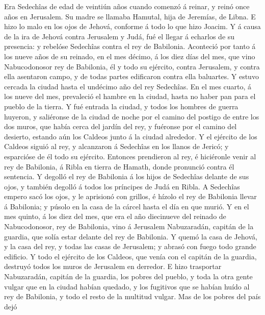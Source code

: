  Era Sedechîas de edad de veintiún años cuando comenzó á
reinar, y reinó once años en Jerusalem. Su madre se llamaba Hamutal,
hija de Jeremías, de Libna.  E hizo lo malo en los ojos de
Jehová, conforme á todo lo que hizo Joacim.  Y á causa de
la ira de Jehová contra Jerusalem y Judá, fué el llegar á echarlos de su
presencia: y rebelóse Sedechîas contra el rey de Babilonia.
 Aconteció por tanto á los nueve años de su reinado, en el
mes décimo, á los diez días del mes, que vino Nabucodonosor rey de
Babilonia, él y todo su ejército, contra Jerusalem, y contra ella
asentaron campo, y de todas partes edificaron contra ella baluartes.
 Y estuvo cercada la ciudad hasta el undécimo año del rey
Sedechîas.  En el mes cuarto, á los nueve del mes,
prevaleció el hambre en la ciudad, hasta no haber pan para el pueblo de
la tierra.  Y fué entrada la ciudad, y todos los hombres
de guerra huyeron, y saliéronse de la ciudad de noche por el camino del
postigo de entre los dos muros, que había cerca del jardín del rey, y
fuéronse por el camino del desierto, estando aún los Caldeos junto á la
ciudad alrededor.  Y el ejército de los Caldeos siguió al
rey, y alcanzaron á Sedechîas en los llanos de Jericó; y esparcióse de
él todo su ejército.  Entonces prendieron al rey, é
hiciéronle venir al rey de Babilonia, á Ribla en tierra de Hamath, donde
pronunció contra él sentencia.  Y degolló el rey de
Babilonia á los hijos de Sedechîas delante de sus ojos, y también
degolló á todos los príncipes de Judá en Ribla.  A
Sedechîas empero sacó los ojos, y le aprisionó con grillos, é hízolo el
rey de Babilonia llevar á Babilonia; y púsolo en la casa de la cárcel
hasta el día en que murió.  Y en el mes quinto, á los
diez del mes, que era el año diecinueve del reinado de Nabucodonosor,
rey de Babilonia, vino á Jerusalem Nabuzaradán, capitán de la guardia,
que solía estar delante del rey de Babilonia.  Y quemó la
casa de Jehová, y la casa del rey, y todas las casas de Jerusalem; y
abrasó con fuego todo grande edificio.  Y todo el
ejército de los Caldeos, que venía con el capitán de la guardia,
destruyó todos los muros de Jerusalem en derredor.  E
hizo trasportar Nabuzaradán, capitán de la guardia, los pobres del
pueblo, y toda la otra gente vulgar que en la ciudad habían quedado, y
los fugitivos que se habían huído al rey de Babilonia, y todo el resto
de la multitud vulgar.  Mas de los pobres del país dejó
